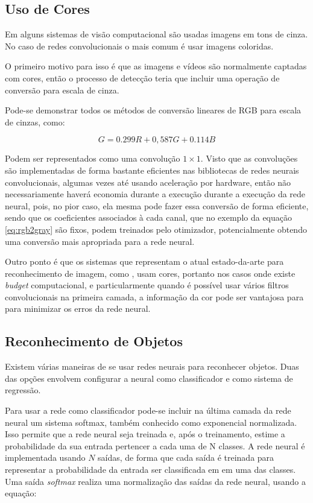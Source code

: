 \subsection{Uso de Cores}
Em alguns sistemas de visão computacional são usadas imagens em
tons de cinza. No caso de redes convolucionais o mais comum é usar
imagens coloridas.

O primeiro motivo para isso é que as imagens e vídeos são normalmente
captadas com cores, então o processo de detecção teria que incluir uma operação
de conversão para escala de cinza. 

Pode-se demonstrar todos os métodos de conversão lineares de RGB para escala de
cinzas, como:

\begin{equation} \label{eq:rgb2gray}
	G=0.299R + 0,587G + 0.114B
\end{equation}

Podem ser representados como uma convolução $1 \times 1$. Visto que as
convoluções são implementadas de forma bastante eficientes nas bibliotecas
de redes neurais convolucionais, algumas vezes até usando aceleração por
hardware, então não necessariamente haverá economia durante a execução
durante a execução da rede neural, pois, no pior caso, ela mesma pode fazer
essa conversão de forma eficiente, sendo que os coeficientes associados
à cada canal, que no exemplo da equação \ref{eq:rgb2gray} são fixos, podem
treinados pelo otimizador, potencialmente obtendo uma conversão mais apropriada
para a rede neural.

Outro ponto é que os sistemas que representam o atual
estado-da-arte para reconhecimento de imagem, como \cite{szegedy2015going}
\cite{hasanpour2016lets}, usam cores, portanto nos casos onde
existe \emph{budget} computacional, e particularmente quando é possível usar
vários filtros convolucionais na primeira camada, a informação da cor pode
ser vantajosa para para minimizar os erros da rede neural.

\subsection{Reconhecimento de Objetos}
Existem várias maneiras de se usar redes neurais para reconhecer objetos. Duas
das opções envolvem configurar a neural como classificador e como sistema de
regressão.

Para usar a rede como classificador pode-se incluir na última camada da rede
neural um sistema softmax, também conhecido como exponencial normalizada. Isso
permite que a rede neural seja treinada e, após o treinamento, estime a
probabilidade da sua entrada pertencer a cada uma de N classes. A rede neural é
implementada usando $N$ saídas, de forma que cada saída é treinada para
representar a probabilidade da entrada ser classificada em em uma das classes.
Uma saída \emph{softmax} realiza uma normalização das saídas da rede neural,
usando a equação:

